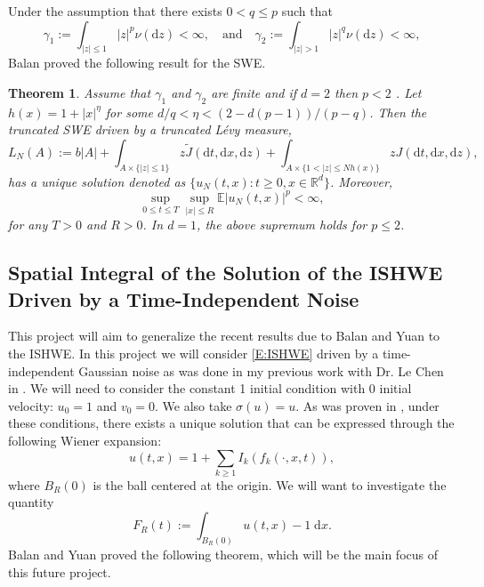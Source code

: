 \documentclass[a4paper,11pt]{article}
\numberwithin{equation}{section}
\theoremstyle{plain}
\newtheorem{theorem}{Theorem}[section]
\theoremstyle{definition}
\newcommand{\ud}{\ensuremath{\mathrm{d} }}
\newcommand{\R}{\mathbb{R}}
\numberwithin{NQ}{section}
\numberwithin{LQ}{section}
\numberwithin{ZQ}{section}
\begin{document}
Under the assumption that there exists $0<q\le p$ such that 
	\[
		\gamma_1 := \int_{|z| \le 1} |z|^p \nu(\ud z) < \infty, \quad \text{and} \quad \gamma_2 := \int_{|z|>1} |z|^q \nu(\ud z) < \infty,
	\]
Balan \cite{Balan22} proved the following result for the SWE.
	\begin{theorem}
		Assume that $\gamma_1$ and $\gamma_2$ are finite and if $d=2$ then $ p <2$ . Let $h(x) = 1 + |x|^\eta$ for some $d/q < \eta < (2-d(p-1))/(p-q)$. Then the truncated SWE driven by a truncated L\'evy measure,
			\[
				L_N(A) := b|A| + \int_{A \times \{|z| \le 1\}} z \tilde{J}(\ud t, \ud x, \ud z) +    \int_{A \times \{1 < |z| \le Nh(x)\}} z J(\ud t, \ud x, \ud z),
			\]
		has a unique solution denoted as $\{ u_N(t,x): t \ge 0, x\in\R^d \}$. Moreover,	
			\[
				\sup_{0 \le t \le T}\sup_{|x| \le R} \mathbb{E}|u_N(t,x)|^p < \infty, 
			\]
		for any $T>0$ and $R>0$. In $d=1$, the above supremum holds for $p \le 2$. 
	\end{theorem}

\subsection{Spatial Integral of the Solution of the ISHWE Driven by a Time-Independent Noise}

This project will aim to generalize the recent results due to Balan and Yuan \cite{BY22} to the ISHWE. In this project we will consider \eqref{E:ISHWE} driven by a time-independent Gaussian noise as was done in my previous work with Dr. Le Chen in \cite{CE21}. We will need to consider the constant 1 initial condition with 0 initial velocity: $u_0 =1$ and $v_0 =0$. We also take $\sigma(u)=u$. As was proven in \cite[Theorem 1.6 and 3.3]{CE21}, under these conditions, there exists a unique solution that can be expressed through the following Wiener expansion:
	\[
		u(t,x) = 1 + \sum_{k \ge 1} I_k(f_k(\cdot,x,t)),
	\]
where $B_R(0)$ is the ball centered at the origin. We will want to investigate the quantity 
	\[
		F_R(t) := \int_{B_R(0)} u(t,x) -1 \; \ud x.
	\]
Balan and Yuan \cite{BY22} proved the following theorem, which will be the main focus of this future project. 
\end{document}
